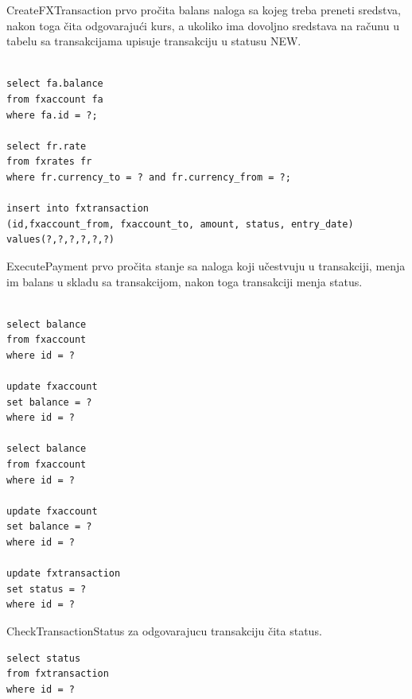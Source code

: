 \documentclass[12pt,oneside]{memoir}
\begin{document}
CreateFXTransaction prvo pročita balans naloga sa kojeg treba preneti sredstva, nakon toga čita odgovarajući kurs, a ukoliko ima dovoljno sredstava na računu u tabelu sa transakcijama upisuje transakciju u statusu NEW.


\begin{lstlisting}[title={CreateFXTransaction},captionpos=t]

select fa.balance
from fxaccount fa
where fa.id = ?;

select fr.rate
from fxrates fr
where fr.currency_to = ? and fr.currency_from = ?;

insert into fxtransaction
(id,fxaccount_from, fxaccount_to, amount, status, entry_date)
values(?,?,?,?,?,?)

\end{lstlisting}

ExecutePayment prvo pročita stanje sa naloga koji učestvuju u transakciji, menja im balans u skladu sa transakcijom, nakon toga transakciji menja status.




\begin{lstlisting}[title={ExecutePayment},captionpos=t]

select balance
from fxaccount
where id = ?

update fxaccount
set balance = ?
where id = ?

select balance
from fxaccount
where id = ?

update fxaccount
set balance = ?
where id = ?

update fxtransaction
set status = ?
where id = ?

\end{lstlisting}

CheckTransactionStatus za odgovarajucu transakciju čita status.


\begin{lstlisting}[title={CheckTransactionStatus},captionpos=t]
select status
from fxtransaction
where id = ?
\end{lstlisting}
\end{document}
